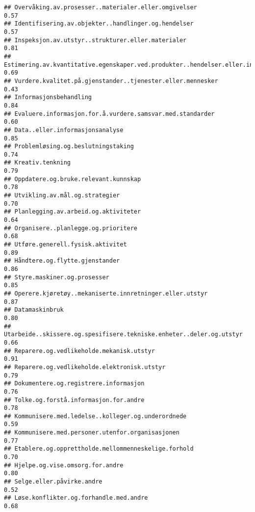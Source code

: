 \documentclass[
]{article}
\begin{document}
\begin{verbatim}
## Overvåking.av.prosesser..materialer.eller.omgivelser                             0.57
## Identifisering.av.objekter..handlinger.og.hendelser                              0.57
## Inspeksjon.av.utstyr..strukturer.eller.materialer                                0.81
## Estimering.av.kvantitative.egenskaper.ved.produkter..hendelser.eller.informasjon 0.69
## Vurdere.kvalitet.på.gjenstander..tjenester.eller.mennesker                       0.43
## Informasjonsbehandling                                                           0.84
## Evaluere.informasjon.for.å.vurdere.samsvar.med.standarder                        0.60
## Data..eller.informasjonsanalyse                                                  0.85
## Problemløsing.og.beslutningstaking                                               0.74
## Kreativ.tenkning                                                                 0.79
## Oppdatere.og.bruke.relevant.kunnskap                                             0.78
## Utvikling.av.mål.og.strategier                                                   0.70
## Planlegging.av.arbeid.og.aktiviteter                                             0.64
## Organisere..planlegge.og.prioritere                                              0.68
## Utføre.generell.fysisk.aktivitet                                                 0.89
## Håndtere.og.flytte.gjenstander                                                   0.86
## Styre.maskiner.og.prosesser                                                      0.85
## Operere.kjøretøy..mekaniserte.innretninger.eller.utstyr                          0.87
## Datamaskinbruk                                                                   0.80
## Utarbeide..skissere.og.spesifisere.tekniske.enheter..deler.og.utstyr             0.66
## Reparere.og.vedlikeholde.mekanisk.utstyr                                         0.91
## Reparere.og.vedlikeholde.elektronisk.utstyr                                      0.79
## Dokumentere.og.registrere.informasjon                                            0.76
## Tolke.og.forstå.informasjon.for.andre                                            0.78
## Kommunisere.med.ledelse..kolleger.og.underordnede                                0.59
## Kommunisere.med.personer.utenfor.organisasjonen                                  0.77
## Etablere.og.opprettholde.mellommenneskelige.forhold                              0.70
## Hjelpe.og.vise.omsorg.for.andre                                                  0.80
## Selge.eller.påvirke.andre                                                        0.52
## Løse.konflikter.og.forhandle.med.andre                                           0.68

\end{verbatim}
\end{document}
